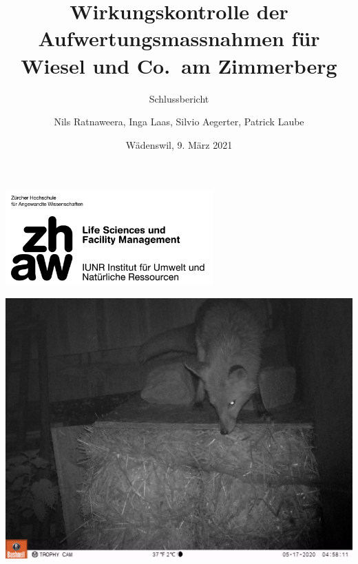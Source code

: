 \documentclass[
]{scrbook}
\title{Wirkungskontrolle der Aufwertungsmassnahmen für Wiesel und Co.~am Zimmerberg}
\subtitle{Schlussbericht}
\author{Nils Ratnaweera, Inga Laas, Silvio Aegerter, Patrick Laube}
\date{Wädenswil, 9. März 2021}
\begin{document}
\maketitle


\makeatletter
\begin{titlepage}

\thispagestyle{empty}
\includegraphics[width=0.6\textwidth]{images/zhaw_lsfm_iunr_schwarz.jpg}

\begin{center}

\includegraphics{images/Fuchs_2_Str_60_WK04.JPG}

\vspace{10pt}

{\huge \@title}

\vspace{30pt}

% 



\end{center}



\begin{flushleft}

\begin{minipage}{21cm}
\vspace{10cm}



\end{minipage}
\end{flushleft}
\end{titlepage}
\end{document}
